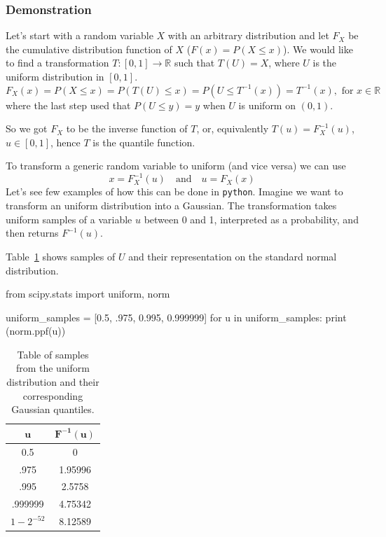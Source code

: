 \begin{attention}
\subsubsection{Demonstration}
Let's start with a random variable $X$ with an arbitrary distribution and let $F_X$ be the cumulative distribution function of $X$ (\(F(x) = P(X \leq x)\)). 
We would like to find a transformation $T:[0,1]\rightarrow\mathbb{R}$ such that $T(U)=X$, where $U$ is the uniform distribution in $[0,1]$. 
\begin{equation*}
F_X(x)= P(X\leq x)=P(T(U)\leq x)= P(U\leq T^{-1}(x))=T^{-1}(x),{\text{ for }}x\in \mathbb {R}
\end{equation*}
where the last step used that $P(U\leq y)=y$ when $U$ is uniform on $(0,1)$.

So we got $F_{X}$ to be the inverse function of $T$, or, equivalently $T(u)=F_{X}^{-1}(u)$, $u\in [0,1]$, hence $T$ is the quantile function.
\end{attention}

To transform a generic random variable to uniform (and vice versa) we can use
\begin{equation}
x = F_{X}^{-1}(u)\quad\mathrm{and}\quad u = F_X(x)	
\end{equation} 
Let's see few examples of how this can be done in \texttt{python}. Imagine we want to transform an uniform distribution into a Gaussian. The transformation takes uniform samples of a variable \(u\) between 0 and 1, interpreted as a probability, and then returns $F^{-1}(u)$. 

Table~\ref{tab:transformation} shows samples of $U$ and their representation on the standard normal distribution.

\begin{ipython}
from scipy.stats import uniform, norm

uniform_samples = [0.5, .975, 0.995, 0.999999]
for u in uniform_samples:
    print (norm.ppf(u))
\end{ipython}

\begin{table}[h]
  \centering
  \begin{tabular}{|c|c|}
    \hline
    \(\mathbf{u}\) & \(\mathbf{F^{-1}(u)}\) \\
    \hline
    0.5 & 0 \\
    \hline
    .975 & 1.95996 \\
    \hline
    .995 & 2.5758 \\
    \hline
    .999999 & 4.75342 \\
    \hline
    \(1-2^{-52}\) & 8.12589 \\
    \hline
  \end{tabular}
  \caption{Table of samples from the uniform distribution and their corresponding Gaussian quantiles.}
\label{tab:transformation}
\end{table}

